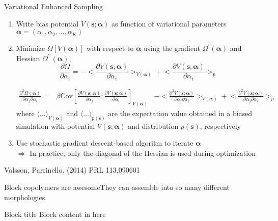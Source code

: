 \documentclass{beamer}
\begin{document}
\begin{frame}{Variational Enhanced Sampling}
\begin{enumerate}
\item Write bias potential $V(\bm{s};\bm{\alpha})$ as function of variational parameters $\bm{\alpha} = (\alpha_1, \alpha_2, ..., \alpha_K)$

\item Minimize $\Omega[V(\bm{\alpha})]$ with respect to $\bm{\alpha}$ using the gradient $\Omega^\prime(\bm{\alpha})$ and Hessian $\Omega^{\prime\prime}(\bm{\alpha})$,
\begin{equation}
\frac{\partial \Omega}{\partial \alpha_i} = - \biggl< \frac{\partial V(\bm{s};\bm{\alpha})}{\partial \alpha_i} \biggr>_{V(\bm{\alpha})}
                                            + \biggl< \frac{\partial V(\bm{s};\bm{\alpha})}{\partial \alpha_i} \biggr>_{p}
\end{equation}

{\scriptsize
\begin{align}
\frac{\partial^2 \Omega(\bm{\alpha})}{\partial \alpha_j \partial \alpha_i} = & \beta \mathrm{Cov} \left[\frac{\partial V(\bm{s};\bm{\alpha})}{\partial \alpha_j}; \frac{\partial V(\bm{s}; \bm{\alpha})}{\partial \alpha_i} \right]_{V(\bm{\alpha})} %
               & - \biggl<\frac{\partial^2 V(\bm{s};\bm{\alpha})}{\partial \alpha_j \partial \alpha_i} \biggr>_{V(\bm{\alpha})} 
                 + \biggl<\frac{\partial^2 V(\bm{s};\bm{\alpha})}{\partial \alpha_j \partial \alpha_i} \biggr>_{p} 
\end{align}
}
where $\langle ... \rangle_{V(\bm{\alpha})}$ and $\langle ... \rangle_{p(\bm{s})}$ are the expectation value obtained in a biased simulation with potential $V(\bm{s};\bm{\alpha})$ and distribution $p(\bm{s})$, respectively
\item Use stochastic gradient descent-based algoritm to iterate $\bm{\alpha}$
\\\textcolor{UCSBaqua}{$\Rightarrow$ In practice, only the diagonal of the Hessian is used during optimization}

\end{enumerate}

\tiny \hfill Valsson, Parrinello. (2014) PRL 113,090601 
\end{frame}

\begin{frame}{Block copolymers are awesome}{They can assemble into so many different morphologies}
    \begin{block}{Block title}
    Block content in here
    \end{block}
\end{frame}
\end{document}
